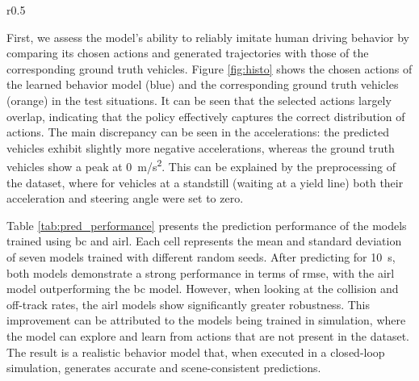\documentclass[a4paper,12pt,onecolumn]{article}
\begin{document}
\begin{wraptable}{r}{0.5\textwidth} %
    \centering
    \vspace{0pt}
    \vspace{-6pt}
    \caption{Prediction performance after \SI{10}{s}.}
    \label{tab:pred_performance}
    \vspace{-10pt} %
\end{wraptable}

First, we assess the model's ability to reliably imitate human driving behavior by comparing its chosen actions and generated trajectories with those of the corresponding ground truth vehicles. 
Figure \ref{fig:histo} shows the chosen actions of the learned behavior model (blue) and the corresponding ground truth vehicles (orange) in the test situations. It can be seen that the selected actions largely overlap, indicating that the policy effectively captures the correct distribution of actions. The main discrepancy can be seen in the accelerations: the predicted vehicles exhibit slightly more negative accelerations, whereas the ground truth vehicles show a peak at \SI{0}{m/s^2}. This can be explained by the preprocessing of the dataset, where for vehicles at a standstill (\eg waiting at a yield line) both their acceleration and steering angle were set to zero.

Table \ref{tab:pred_performance} presents the prediction performance of the models trained using \gls{bc} and \gls{airl}. Each cell represents the mean and standard deviation of seven models trained with different random seeds. After predicting for \SI{10}{s}, both models demonstrate a strong performance in terms of \gls{rmse}, with the \gls{airl} model outperforming the \gls{bc} model. 
However, when looking at the collision and off-track rates, the \gls{airl} models show significantly greater robustness. This improvement can be attributed to the models being trained in simulation, where the model can explore and learn from actions that are not present in the dataset. The result is a realistic behavior model that, when executed in a closed-loop simulation, generates accurate and scene-consistent predictions. 
\end{document}
